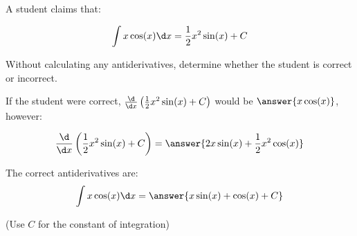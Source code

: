 \documentclass{ximera}
\author{Jim Talamo}
\begin{document}
\begin{exercise}
A student claims that:

\[
\int x \cos(x) \d x = \frac{1}{2} x^2 \sin(x) +C
\]

Without calculating any antiderivatives, determine whether the student is correct or incorrect. 

\begin{multipleChoice}
\end{multipleChoice}

If the student were correct, $\frac{\d}{\d x} \left(\frac{1}{2} x^2 \sin(x) +C\right)$ would be $\answer{x \cos(x)}$, however:


\[
\frac{\d}{\d x} \left(\frac{1}{2} x^2 \sin(x) +C\right) = \answer{2x \sin(x)+\frac{1}{2}x^2 \cos(x)}
\]

\begin{exercise}
The correct antiderivatives are:
\[
\int x \cos(x) \d x = \answer{x \sin(x)+\cos(x) +C}
\]

(Use $C$ for the constant of integration)

\end{exercise}
\end{exercise}
\end{document}
